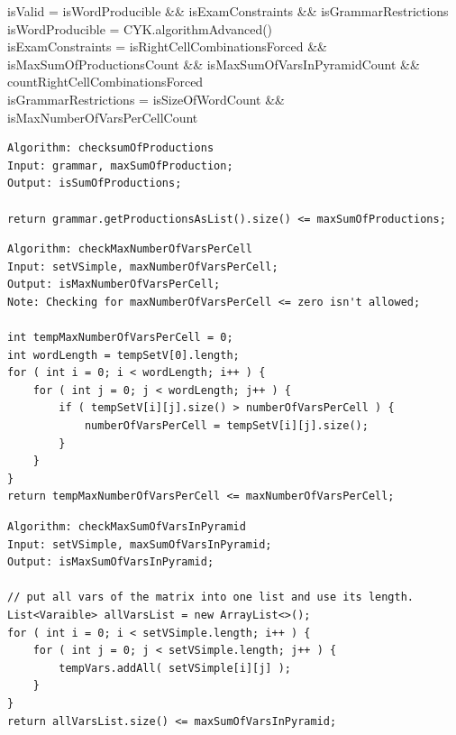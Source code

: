 \noindent  isValid = isWordProducible \&\& isExamConstraints \&\& isGrammarRestrictions\\

\noindent  isWordProducible = CYK.algorithmAdvanced()\\

\noindent  isExamConstraints = isRightCellCombinationsForced \&\& isMaxSumOfProductionsCount \&\& isMaxSumOfVarsInPyramidCount \&\& countRightCellCombinationsForced \\

\noindent isGrammarRestrictions = isSizeOfWordCount \&\& isMaxNumberOfVarsPerCellCount \\

\lstset{language=java}
\begin{lstlisting}[frame=htrbl, caption={checksumOfProductions}, 
label={lst:checksumOfProductions}]
Algorithm: checksumOfProductions
Input: grammar, maxSumOfProduction;
Output: isSumOfProductions;

return grammar.getProductionsAsList().size() <= maxSumOfProductions; 
\end{lstlisting}

\pagebreak
\lstset{language=java}
\begin{lstlisting}[frame=htrbl, caption={checkMaxNumberOfVarsPerCell}, 
label={lst:checkMaxNumberOfVarsPerCell}]
Algorithm: checkMaxNumberOfVarsPerCell
Input: setVSimple, maxNumberOfVarsPerCell;
Output: isMaxNumberOfVarsPerCell;
Note: Checking for maxNumberOfVarsPerCell <= zero isn't allowed;

int tempMaxNumberOfVarsPerCell = 0;
int wordLength = tempSetV[0].length;
for ( int i = 0; i < wordLength; i++ ) {
	for ( int j = 0; j < wordLength; j++ ) {
		if ( tempSetV[i][j].size() > numberOfVarsPerCell ) {
			numberOfVarsPerCell = tempSetV[i][j].size();
		}
	}
}
return tempMaxNumberOfVarsPerCell <= maxNumberOfVarsPerCell;
\end{lstlisting}

\pagebreak

\lstset{language=java}
\begin{lstlisting}[frame=htrbl, caption={checkMaxSumOfVarsInPyramid}, 
label={lst:checkMaxSumOfVarsInPyramid}]
Algorithm: checkMaxSumOfVarsInPyramid
Input: setVSimple, maxSumOfVarsInPyramid;
Output: isMaxSumOfVarsInPyramid;

// put all vars of the matrix into one list and use its length.
List<Varaible> allVarsList = new ArrayList<>();
for ( int i = 0; i < setVSimple.length; i++ ) {
	for ( int j = 0; j < setVSimple.length; j++ ) {
		tempVars.addAll( setVSimple[i][j] );
	}
}
return allVarsList.size() <= maxSumOfVarsInPyramid; 
\end{lstlisting}

